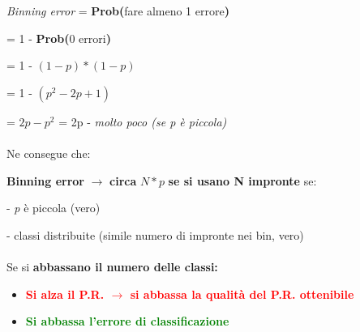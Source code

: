 \textit{Binning error} = \textbf{Prob(}fare almeno 1 errore\textbf{)}

= 1 - \textbf{Prob(}0 errori\textbf{)}

= 1 - $(1-p)*(1-p)$

= 1 - $(p^2-2p+1)$

= $2p - p^2$ = 2p - \textit{molto poco (se p è piccola)}
\\
\\
Ne consegue che:

\textbf{Binning error} $\rightarrow$ \textbf{circa} $N*p$ \textbf{se si usano N impronte} se:

- \textit{p} è piccola (vero)

- classi distribuite (simile numero di impronte nei bin, vero)\\\\
Se si \textbf{abbassano il numero delle classi:}
\begin{itemize}
    \item \textbf{\textcolor{red}{Si alza il P.R. $\rightarrow$ si abbassa la qualità del P.R. ottenibile}}
    \item \textbf{\textcolor{green}{Si abbassa l'errore di classificazione}}
\end{itemize}




